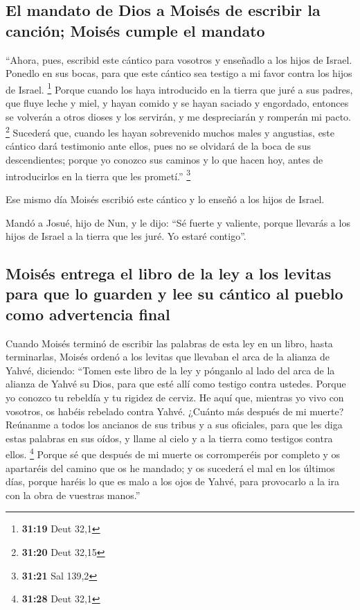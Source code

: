 \hypertarget{el-mandato-de-dios-a-moisuxe9s-de-escribir-la-canciuxf3n-moisuxe9s-cumple-el-mandato}{%
\subsection{El mandato de Dios a Moisés de escribir la canción; Moisés
cumple el
mandato}\label{el-mandato-de-dios-a-moisuxe9s-de-escribir-la-canciuxf3n-moisuxe9s-cumple-el-mandato}}

 ``Ahora, pues, escribid este cántico para vosotros y
enseñadlo a los hijos de Israel. Ponedlo en sus bocas, para que este
cántico sea testigo a mi favor contra los hijos de Israel. \footnote{\textbf{31:19}
  Deut 32,1}  Porque cuando los haya introducido en la
tierra que juré a sus padres, que fluye leche y miel, y hayan comido y
se hayan saciado y engordado, entonces se volverán a otros dioses y los
servirán, y me despreciarán y romperán mi pacto. \footnote{\textbf{31:20}
  Deut 32,15}  Sucederá que, cuando les hayan sobrevenido
muchos males y angustias, este cántico dará testimonio ante ellos, pues
no se olvidará de la boca de sus descendientes; porque yo conozco sus
caminos y lo que hacen hoy, antes de introducirlos en la tierra que les
prometí.'' \footnote{\textbf{31:21} Sal 139,2}

 Ese mismo día Moisés escribió este cántico y lo enseñó a
los hijos de Israel.

 Mandó a Josué, hijo de Nun, y le dijo: ``Sé fuerte y
valiente, porque llevarás a los hijos de Israel a la tierra que les
juré. Yo estaré contigo''.

\hypertarget{moisuxe9s-entrega-el-libro-de-la-ley-a-los-levitas-para-que-lo-guarden-y-lee-su-cuxe1ntico-al-pueblo-como-advertencia-final}{%
\subsection{Moisés entrega el libro de la ley a los levitas para que lo
guarden y lee su cántico al pueblo como advertencia
final}\label{moisuxe9s-entrega-el-libro-de-la-ley-a-los-levitas-para-que-lo-guarden-y-lee-su-cuxe1ntico-al-pueblo-como-advertencia-final}}

 Cuando Moisés terminó de escribir las palabras de esta
ley en un libro, hasta terminarlas,  Moisés ordenó a los
levitas que llevaban el arca de la alianza de Yahvé, diciendo:
 ``Tomen este libro de la ley y pónganlo al lado del arca
de la alianza de Yahvé su Dios, para que esté allí como testigo contra
ustedes.  Porque yo conozco tu rebeldía y tu rigidez de
cerviz. He aquí que, mientras yo vivo con vosotros, os habéis rebelado
contra Yahvé. ¿Cuánto más después de mi muerte?  Reúnanme
a todos los ancianos de sus tribus y a sus oficiales, para que les diga
estas palabras en sus oídos, y llame al cielo y a la tierra como
testigos contra ellos. \footnote{\textbf{31:28} Deut 32,1}
 Porque sé que después de mi muerte os corromperéis por
completo y os apartaréis del camino que os he mandado; y os sucederá el
mal en los últimos días, porque haréis lo que es malo a los ojos de
Yahvé, para provocarlo a la ira con la obra de vuestras manos.''

